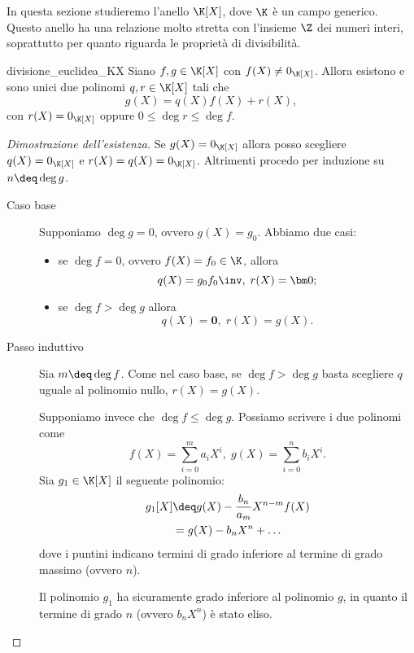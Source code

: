 In questa sezione studieremo l'anello $\K[X]$, dove $\K$ è un campo generico. Questo anello ha una relazione molto stretta con l'insieme $\Z$ dei numeri interi, soprattutto per quanto riguarda le proprietà di divisibilità.

\begin{theorem}
    {divisione_euclidea_KX}
    Siano $f, g \in \K[X]$ con $f(X) \neq 0_{\K[X]}$. Allora esistono e sono unici due polinomi $q, r \in \K[X]$ tali che \[
        g(X) = q(X)f(X) + r(X),
    \] con $r(X) = 0_{\K[X]}$ oppure $0 \leq \deg r \leq \deg f$.
\end{theorem}
\begin{proof}[Dimostrazione dell'esistenza]
    Se $g(X) = 0_{\K[X]}$ allora posso scegliere $q(X) = 0_{\K[X]}$ e $r(X) = q(X) = 0_{\K[X]}$.
    Altrimenti procedo per induzione su $n \deq \deg g$.
    \begin{description}
        \item[Caso base] Supponiamo $\deg g = 0$, ovvero $g(X) = g_0$. Abbiamo due casi: \begin{itemize}
            \item se $\deg f = 0$, ovvero $f(X) = f_0 \in \K$, allora \[
                q(X) = g_0{f_0}\inv, \; r(X) = \bm 0;
            \]
            \item se $\deg f > \deg g$ allora \[
                q(X) = \bm 0, \; r(X) = g(X).    
            \]
        \end{itemize}
        \item[Passo induttivo] Sia $m \deq \deg f$. Come nel caso base, se $\deg f > \deg g$ basta scegliere $q$ uguale al polinomio nullo, $r(X) = g(X)$.
        
        Supponiamo invece che $\deg f \leq \deg g$. Possiamo scrivere i due polinomi come \[
            f(X) = \sum_{i = 0}^m a_iX^i, \; g(X) = \sum_{i = 0}^n b_iX^i.    
        \]
        Sia $g_1 \in \K[X]$ il seguente polinomio: \begin{align*}
            g_1[X] &\deq g(X) - \frac{b_n}{a_m}X^{n-m}f(X)\\  
            &= g(X) - b_nX^n + \dots 
        \end{align*}
        dove i puntini indicano termini di grado inferiore al termine di grado massimo (ovvero $n$).

        Il polinomio $g_1$ ha sicuramente grado inferiore al polinomio $g$, in quanto il termine di grado $n$ (ovvero $b_nX^n$) è stato eliso.


\end{description}
\end{proof}
